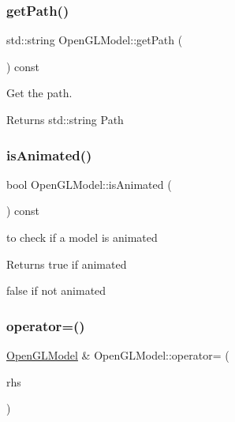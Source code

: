 \subsubsection{\texorpdfstring{get\+Path()}{getPath()}}
{\footnotesize\ttfamily std\+::string Open\+G\+L\+Model\+::get\+Path (\begin{DoxyParamCaption}{ }\end{DoxyParamCaption}) const}



Get the path. 

\begin{DoxyReturn}{Returns}
std\+::string Path 
\end{DoxyReturn}
\mbox{\label{class_open_g_l_model_abafc4c5a2350939ab5d70bf3cebd11d5}} 
\subsubsection{\texorpdfstring{is\+Animated()}{isAnimated()}}
{\footnotesize\ttfamily bool Open\+G\+L\+Model\+::is\+Animated (\begin{DoxyParamCaption}{ }\end{DoxyParamCaption}) const}



to check if a model is animated 

\begin{DoxyReturn}{Returns}
true if animated 

false if not animated 
\end{DoxyReturn}
\mbox{\label{class_open_g_l_model_a5a1d89d46e6cf8dd40f4c66058575a1e}} 
\subsubsection{\texorpdfstring{operator=()}{operator=()}}
{\footnotesize\ttfamily \hyperlink{class_open_g_l_model}{Open\+G\+L\+Model} \& Open\+G\+L\+Model\+::operator= (\begin{DoxyParamCaption}\item[{\hyperlink{class_open_g_l_model}{Open\+G\+L\+Model} const \&}]{rhs }\end{DoxyParamCaption})}



